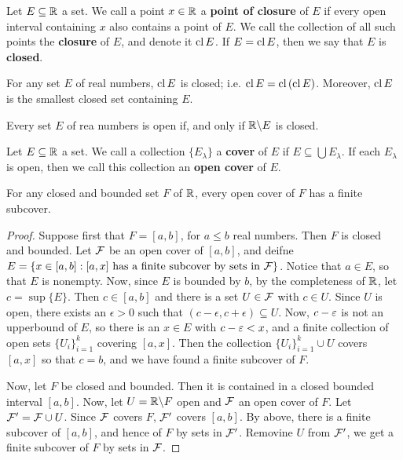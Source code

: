 \begin{definition}
    Let $E \subseteq \mathbb{R}$ a set. We call a point $x \in \mathbb{R}$ a  \textbf{point of
    closure} of $E$ if every open interval containing  $x$ also contains a point
    of  $E$. We call the collection of all such points the  \textbf{closure} of
    $E$, and denote it $\operatorname{cl}{E}$. If $E=\operatorname{cl}{E}$, then we say that $E$ is
    \textbf{closed}.
\end{definition}

\begin{lemma}\label{1.1.3}
    For any set $E$ of real numbers,  $\operatorname{cl}{E}$ is closed; i.e.
    $\operatorname{cl}{E}=\operatorname{cl}{(\operatorname{cl}{E})}$. Moreover, $\operatorname{cl}{E}$ is the smallest closed set
    containing $E$.
\end{lemma}

\begin{lemma}\label{1.1.4}
    Every set $E$ of rea numbers is open if, and only if  $\mathbb{R}\backslash E$ is
    closed.
\end{lemma}

\begin{definition}
    Let $E \subseteq \mathbb{R}$ a set. We call a collection  $\{E_{\lambda}\}$ a
    \textbf{cover} of $E$ if  $E \subseteq \bigcup{E_\lambda}$. If each
    $E_\lambda$ is open, then we call this collection an  \textbf{open cover} of
    $E$.
\end{definition}

\begin{theorem}\label{1.1.5}
    For any closed and bounded set $F$ of  $\mathbb{R}$, every open cover of  $F$ has a
    finite subcover.
\end{theorem}
\begin{proof}
    Suppose first that $F=[a,b]$, for $a \leq b$ real numbers. Then  $F$ is
    closed and bounded. Let  $\mathcal{F}$ be an open cover of  $[a,b]$, and deifne
    $E=\{x \in [a,b] : [a,x] \text{ has a finite subcover by sets in } \mathcal{F}\}$.
    Notice that $a \in E$, so that $E$ is nonempty. Now, since  $E$ is bounded
    by  $b$, by the completeness of  $\mathbb{R}$, let  $c=\sup{\{E\}}$. Then $c \in
    [a,b]$ and there is a set $U \in \mathcal{F}$ with  $c \in U$. Since  $U$ is open,
    there exists an  $\epsilon>0$ such that  $(c-\epsilon, c+\epsilon) \subseteq
    U$. Now, $c-\varepsilon$ is not an upperbound of $E$, so there is an  $x \in E$ with
     $c-\varepsilon<x$, and a finite collection of open sets  $\{U_i\}_{i=1}^k$ covering
     $[a,x]$. Then the collection $\{U_i\}_{i=1}^k \cup U$ covers $[a,x]$ so
     that $c=b$, and we have found a finite subcover of  $F$.

     Now, let $F$ be closed and bounded. Then it is contained in a closed
     bounded interval  $[a,b]$. Now, let $U=\mathbb{R}\backslash F$ open and $\mathcal{F}$ an open
     cover of  $F$. Let  $\mathcal{F}'=\mathcal{F} \cup U$. Since  $\mathcal{F}$ covers  $F$,
     $\mathcal{F}'$ covers $[a,b]$. By above, there is a finite subcover of $[a,b]$, and
     hence of $F$ by sets in  $\mathcal{F}'$. Removine  $U$ from  $\mathcal{F}'$, we get a
     finite subcover of  $F$ by sets in  $\mathcal{F}$.
\end{proof}

